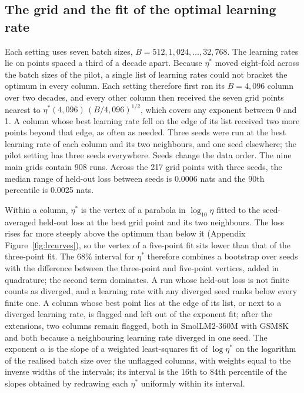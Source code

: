 \documentclass[10pt]{article}
\begin{document}
\subsection{The grid and the fit of the optimal learning rate}\label{sec:grid}

Each setting uses seven batch sizes, $B = 512, 1{,}024, \ldots, 32{,}768$. The learning rates lie on points spaced a third of a decade apart. Because $\eta^*$ moved eight-fold across the batch sizes of the pilot, a single list of learning rates could not bracket the optimum in every column. Each setting therefore first ran its $B = 4{,}096$ column over two decades, and every other column then received the seven grid points nearest to $\eta^*(4{,}096)\,(B/4{,}096)^{1/2}$, which covers any exponent between 0 and 1. A column whose best learning rate fell on the edge of its list received two more points beyond that edge, as often as needed. Three seeds were run at the best learning rate of each column and its two neighbours, and one seed elsewhere; the pilot setting has three seeds everywhere. Seeds change the data order. The nine main grids contain 908 runs. Across the 217 grid points with three seeds, the median range of held-out loss between seeds is 0.0006 nats and the 90th percentile is 0.0025 nats.

Within a column, $\eta^*$ is the vertex of a parabola in $\log_{10}\eta$ fitted to the seed-averaged held-out loss at the best grid point and its two neighbours. The loss rises far more steeply above the optimum than below it (Appendix Figure~\ref{fig:lrcurves}), so the vertex of a five-point fit sits lower than that of the three-point fit. The 68\% interval for $\eta^*$ therefore combines a bootstrap over seeds with the difference between the three-point and five-point vertices, added in quadrature; the second term dominates. A run whose held-out loss is not finite counts as diverged, and a learning rate with any diverged seed ranks below every finite one. A column whose best point lies at the edge of its list, or next to a diverged learning rate, is flagged and left out of the exponent fit; after the extensions, two columns remain flagged, both in SmolLM2-360M with GSM8K and both because a neighbouring learning rate diverged in one seed. The exponent $\alpha$ is the slope of a weighted least-squares fit of $\log \eta^*$ on the logarithm of the realised batch size over the unflagged columns, with weights equal to the inverse widths of the intervals; its interval is the 16th to 84th percentile of the slopes obtained by redrawing each $\eta^*$ uniformly within its interval.
\end{document}
